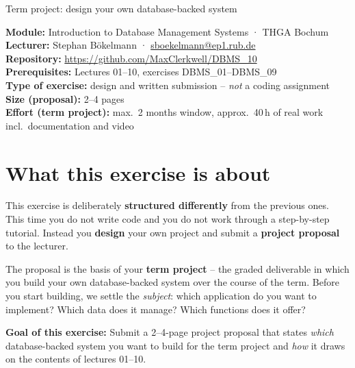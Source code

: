 \documentclass[11pt,a4paper]{article}
\begin{document}
\thispagestyle{empty}
%
{Term project: design your own database-backed system}

\begin{infobox}
\textbf{Module:} Introduction to Database Management Systems · THGA Bochum \\
\textbf{Lecturer:} Stephan Bökelmann · \href{mailto:sboekelmann@ep1.rub.de}{sboekelmann@ep1.rub.de} \\
\textbf{Repository:} \url{https://github.com/MaxClerkwell/DBMS_10} \\
\textbf{Prerequisites:} Lectures 01--10, exercises DBMS\_01--DBMS\_09 \\
\textbf{Type of exercise:} design and written submission -- \emph{not} a coding assignment \\
\textbf{Size (proposal):} 2--4 pages \\
\textbf{Effort (term project):} max.\ 2 months window, approx.\ 40\,h of real work incl.\ documentation and video
\end{infobox}

\tableofcontents
\vspace{1em}

\section{What this exercise is about}

This exercise is deliberately \textbf{structured differently} from the previous
ones. This time you do not write code and you do not work through a
step-by-step tutorial. Instead you \textbf{design} your own project and submit a
\textbf{project proposal} to the lecturer.

The proposal is the basis of your \textbf{term project} -- the graded
deliverable in which you build your own database-backed system over the course
of the term. Before you start building, we settle the \emph{subject}: which
application do you want to implement? Which data does it manage? Which functions
does it offer?

\begin{infobox}
\textbf{Goal of this exercise:} Submit a 2--4-page project proposal that states
\emph{which} database-backed system you want to build for the term project and
\emph{how} it draws on the contents of lectures 01--10.
\end{infobox}
\end{document}

